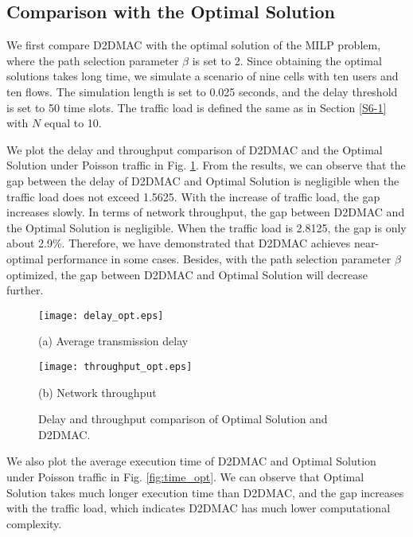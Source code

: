\documentclass[journal]{IEEEtran}
\begin{document}
\subsection{Comparison with the Optimal Solution}

We first compare D2DMAC with the optimal solution of the MILP problem, where the path selection
parameter $\beta$ is set to 2. Since obtaining the optimal solutions takes long time, we simulate a scenario of nine cells with ten users and ten flows.
The simulation length is set to 0.025 seconds, and the delay threshold is set to 50 time slots.
The traffic load is defined the same as in Section \ref{S6-1} with $N$ equal to 10.






We plot the delay and throughput comparison of D2DMAC and the Optimal Solution under Poisson
traffic in Fig. \ref{fig:comparison_opt}. From the results, we can observe that the gap between the delay of D2DMAC and Optimal Solution is negligible when the traffic load does not exceed 1.5625. With the increase of traffic load, the gap increases slowly. In
terms of network throughput, the gap between D2DMAC and the Optimal Solution is negligible. When the traffic load is 2.8125, the gap is only about 2.9\%. Therefore, we have demonstrated that D2DMAC achieves near-optimal
performance in some cases. Besides, with the path selection parameter $\beta$ optimized, the gap between D2DMAC
and Optimal Solution will decrease further.




\begin{figure}[htbp]
\begin{minipage}[t]{0.5\linewidth}
\centering
\texttt{[image: delay\_opt.eps]}
\centerline{\small (a) Average transmission delay}
\end{minipage}\begin{minipage}[t]{0.5\linewidth}
\centering
\texttt{[image: throughput\_opt.eps]}
\centerline{\small (b) Network throughput}
\end{minipage}\caption{Delay and throughput comparison of Optimal Solution and D2DMAC.}
\label{fig:comparison_opt} \vspace*{-3mm}
\end{figure}







We also plot the average execution time of D2DMAC and Optimal Solution under Poisson traffic in
Fig. \ref{fig:time_opt}. We can observe that
Optimal Solution takes much longer execution time than D2DMAC, and the gap increases with the
traffic load, which indicates D2DMAC has much lower computational complexity.
\end{document}
